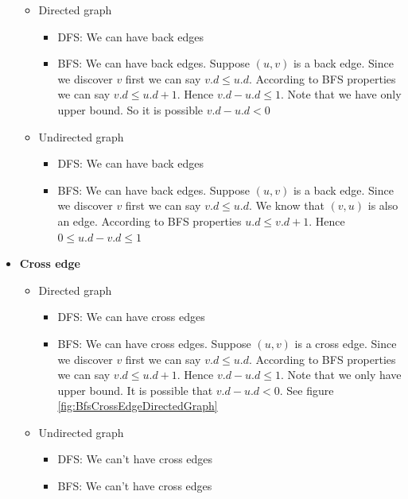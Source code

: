 \documentclass{book}
\begin{document}
\begin{itemize}
		\begin{itemize}
			\item Directed graph
			\begin{itemize}
				\item DFS: We can have back edges
				\item BFS: We can have back edges. Suppose $(u, v)$ is a back edge. Since we discover $v$ first we can say $v.d \le u.d$. According to BFS properties we can say $v.d \le u.d + 1$. Hence $v.d -u.d \le 1$. Note that we have only upper bound. So it is possible $v.d - u.d < 0$
			\end{itemize}
			\item Undirected graph
			\begin{itemize}
				\item DFS: We can have back edges
				\item BFS: We can have back edges. Suppose $(u, v)$ is a back edge. Since we discover $v$ first we can say $v.d \le u.d$. We know that $(v, u)$ is also an edge. According to BFS properties $u.d \le v.d + 1$. Hence $0 \le u.d - v.d \le 1$
			\end{itemize}
		\end{itemize}
		\item \textbf{Cross edge}
		\begin{itemize}
			\item Directed graph
			\begin{itemize}
				\item DFS: We can have cross edges
				\item BFS: We can have cross edges. Suppose $(u, v)$ is a cross edge. Since we discover $v$ first we can say $v.d \le u.d$. According to BFS properties we can say $v.d \le u.d + 1$. Hence $v.d - u.d \le 1$. Note that we only have upper bound. It is possible that $v.d - u.d < 0$. See figure \ref{fig:BfsCrossEdgeDirectedGraph}
			\end{itemize}
			\item Undirected graph
			\begin{itemize}
				\item DFS: We can't have cross edges
				\item BFS: We can't have cross edges
			\end{itemize}
		\end{itemize}		
	\end{itemize}
\end{document}
